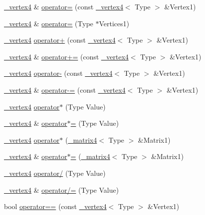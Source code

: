 \begin{DoxyCompactItemize}
\hyperlink{class__vertex4}{\+\_\+vertex4} \& \hyperlink{class__vertex4_a270b10fcdaae2eb58adbde6a73b319c7}{operator=} (const \hyperlink{class__vertex4}{\+\_\+vertex4}$<$ Type $>$ \&Vertex1)
\item 
\hyperlink{class__vertex4}{\+\_\+vertex4} \& \hyperlink{class__vertex4_a6280e3485ab56e36668374289b3885e1}{operator=} (Type $\ast$Vertices1)
\item 
\hyperlink{class__vertex4}{\+\_\+vertex4} \hyperlink{class__vertex4_a4eb008aff6cb04a36fc865a51596d7d9}{operator+} (const \hyperlink{class__vertex4}{\+\_\+vertex4}$<$ Type $>$ \&Vertex1)
\item 
\hyperlink{class__vertex4}{\+\_\+vertex4} \& \hyperlink{class__vertex4_adfe5588d11c163da9acbf3872cb44051}{operator+=} (const \hyperlink{class__vertex4}{\+\_\+vertex4}$<$ Type $>$ \&Vertex1)
\item 
\hyperlink{class__vertex4}{\+\_\+vertex4} \hyperlink{class__vertex4_a153c4669c1cd4dc49d6eb6dd7d0a7613}{operator-\/} (const \hyperlink{class__vertex4}{\+\_\+vertex4}$<$ Type $>$ \&Vertex1)
\item 
\hyperlink{class__vertex4}{\+\_\+vertex4} \& \hyperlink{class__vertex4_aa6f0b88ea882bf84362dcc62bc47bdeb}{operator-\/=} (const \hyperlink{class__vertex4}{\+\_\+vertex4}$<$ Type $>$ \&Vertex1)
\item 
\hyperlink{class__vertex4}{\+\_\+vertex4} \hyperlink{class__vertex4_a63177887ce69e51ceaeb6f6649e39374}{operator$\ast$} (Type Value)
\item 
\hyperlink{class__vertex4}{\+\_\+vertex4} \& \hyperlink{class__vertex4_a5a4944a3258f72ac0e23e1e7468bc46e}{operator$\ast$=} (Type Value)
\item 
\hyperlink{class__vertex4}{\+\_\+vertex4} \hyperlink{class__vertex4_a9d5e5beba88204960cd810bc557a74a0}{operator$\ast$} (\hyperlink{class__matrix4}{\+\_\+matrix4}$<$ Type $>$ \&Matrix1)
\item 
\hyperlink{class__vertex4}{\+\_\+vertex4} \& \hyperlink{class__vertex4_aada7301bf2afc5928d3df948201c3ba7}{operator$\ast$=} (\hyperlink{class__matrix4}{\+\_\+matrix4}$<$ Type $>$ \&Matrix1)
\item 
\hyperlink{class__vertex4}{\+\_\+vertex4} \hyperlink{class__vertex4_ab41b97b5865fc9744a28fa359c505a45}{operator/} (Type Value)
\item 
\hyperlink{class__vertex4}{\+\_\+vertex4} \& \hyperlink{class__vertex4_ab4de81fca0447b577dd38dd4b7782994}{operator/=} (Type Value)
\item 
bool \hyperlink{class__vertex4_a1ba75f342bb68a2ce9fe4d8024d6eef7}{operator==} (const \hyperlink{class__vertex4}{\+\_\+vertex4}$<$ Type $>$ \&Vertex1)

\end{DoxyCompactItemize}
